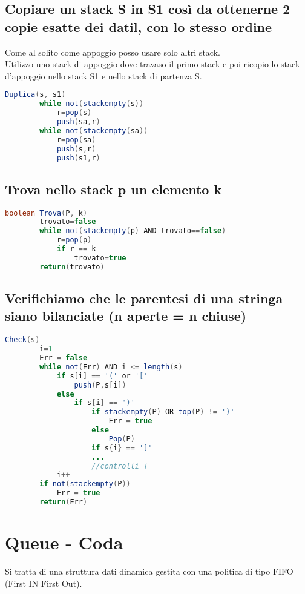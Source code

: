 \subsection{Copiare un stack S in S1 così da ottenerne 2 copie esatte dei datil, con lo stesso
ordine}
Come al solito come appoggio posso usare solo altri stack.\\
Utilizzo uno stack di appoggio dove travaso il primo stack e poi ricopio lo stack
d'appoggio nello stack S1 e nello stack di partenza S.
\begin{lstlisting}[language=Java]
    Duplica(s, s1)
        while not(stackempty(s))
            r=pop(s)
            push(sa,r)
        while not(stackempty(sa))
            r=pop(sa)
            push(s,r)
            push(s1,r)
\end{lstlisting}
\subsection{Trova nello stack p un elemento k}
\begin{lstlisting}[language=Java]
    boolean Trova(P, k)
        trovato=false
        while not(stackempty(p) AND trovato==false)
            r=pop(p)
            if r == k
                trovato=true
        return(trovato)
\end{lstlisting}
\subsection{Verifichiamo che le parentesi di una stringa siano bilanciate (n aperte = n chiuse)}
\begin{lstlisting}[language=Java]
    Check(s)
        i=1
        Err = false
        while not(Err) AND i <= length(s)
            if s[i] == '(' or '['
                push(P,s[i])
            else
                if s[i] == ')'
                    if stackempty(P) OR top(P) != ')'
                        Err = true
                    else
                        Pop(P)
                    if s{i} == ']'
                    ...
                    //controlli ]
            i++
        if not(stackempty(P))
            Err = true
        return(Err)
\end{lstlisting}

\section{Queue - Coda}
Si tratta di una struttura dati dinamica gestita con una politica di tipo FIFO
(First IN First Out).\\
